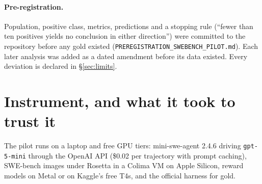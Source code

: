 \documentclass[11pt]{article}
\begin{document}
\paragraph{Pre-registration.} Population, positive class, metrics, predictions and a stopping rule (``fewer than ten positives yields no conclusion in either direction'') were committed to the repository before any gold existed (\texttt{PREREGISTRATION\_SWEBENCH\_PILOT.md}). Each later analysis was added as a dated amendment before its data existed. Every deviation is declared in \S\ref{sec:limits}.

\section{Instrument, and what it took to trust it}\label{sec:instrument}
The pilot runs on a laptop and free GPU tiers: mini-swe-agent 2.4.6 driving \texttt{gpt-5-mini} through the OpenAI API (\$0.02 per trajectory with prompt caching), SWE-bench images under Rosetta in a Colima VM on Apple Silicon, reward models on Metal or on Kaggle's free T4s, and the official harness for gold.
\end{document}

